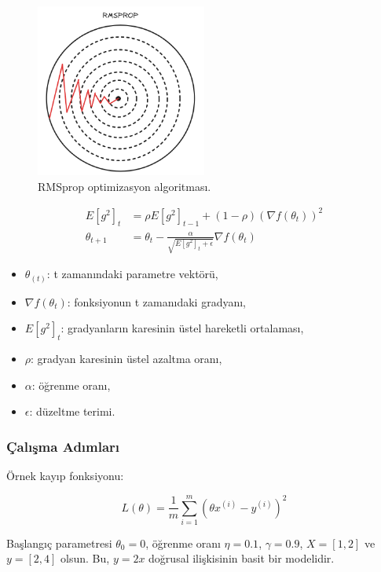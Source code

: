\begin{figure}[h]
    \centering
    \includegraphics[width=0.5\textwidth]{images/rmsprop_optimizer.png}
    \caption{RMSprop optimizasyon algoritması.}
    \label{fig:enter-label}
\end{figure}

\begin{align*}
E[g^2]_t & = \rho E[g^2]_{t-1} + (1 - \rho) (\nabla f(\theta_t))^2 \\
\theta_{t+1} & = \theta_t - \frac{\alpha}{\sqrt{E[g^2]_t + \epsilon}} \nabla f(\theta_t)
\end{align*}

\begin{itemize}
	\item $\theta_(t)$: t zamanındaki parametre vektörü,
	\item $\nabla f(\theta_{t})$: fonksiyonun t zamanıdaki gradyanı,
	\item $E[g^2]_t$: gradyanların karesinin üstel hareketli ortalaması,
	\item $\rho$: gradyan karesinin üstel azaltma oranı,
	\item $\alpha$: öğrenme oranı,
	\item $\epsilon$: düzeltme terimi.
\end{itemize}

\subsubsection{Çalışma Adımları}

Örnek kayıp fonksiyonu:

\[ L(\theta) = \frac{1}{m} \sum_{i=1}^{m} (\theta x^{(i)} - y^{(i)})^2 \]

Başlangıç parametresi $\theta_0 = 0$, öğrenme oranı $\eta = 0.1$, $\gamma = 0.9$, $X = [1, 2]$ ve $y = [2, 4]$ olsun. Bu, $y = 2x$ doğrusal ilişkisinin basit bir modelidir.

